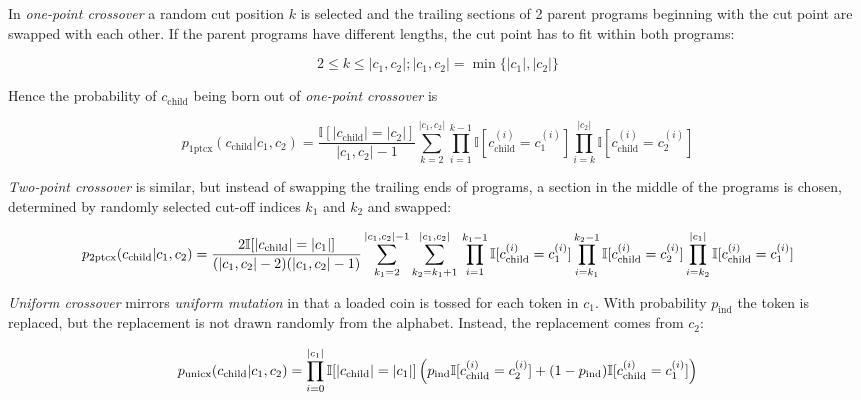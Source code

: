 In \emph{one-point crossover} a random cut position $k$ is selected and the trailing sections of 2 parent programs beginning with the cut point are swapped with each other. 
If the parent programs have different lengths, the cut point has to fit within both programs:

\begin{equation}
    2 \leq k \leq |c_1,c_2|; |c_1,c_2| = \min\{|c_1|, |c_2|\}
\end{equation}

Hence the probability of $c_\text{child}$ being born out of \emph{one-point crossover} is

\begin{equation}
    p_\text{1ptcx}(c_\text{child}|c_1,c_2) =
        \frac{\mathbb{I}[|c_\text{child}|=|c_2|]}{|c_1,c_2|-1}
        \sum\limits_{k=2}^{|c_1,c_2|} \prod\limits_{i=1}^{k-1} \mathbb{I}[c_\text{child}^{(i)} = c_1^{(i)}] \prod\limits_{i=k}^{|c_2|} \mathbb{I}[c_\text{child}^{(i)} = c_2^{(i)}]
\end{equation}

\emph{Two-point crossover} is similar, but instead of swapping the trailing ends of programs, a section in the middle of the programs is chosen, determined by randomly selected cut-off indices $k_1$ and $k_2$ and swapped:

\begin{equation}
    p_\text{2ptcx}(c_\text{child}|c_1,c_2) =
        \frac{2 \mathbb{I}[|c_\text{child}|=|c_1|]}{(|c_1,c_2|-2)(|c_1,c_2|-1)}
        \sum\limits_{k_1=2}^{|c_1,c_2|-1}
        \sum\limits_{k_2=k_1+1}^{|c_1,c_2|} \\
        \prod\limits_{i=1}^{k_1-1} \mathbb{I}[c_\text{child}^{(i)} = c_1^{(i)}] \prod\limits_{i=k_1}^{k_2-1} \mathbb{I}[c_\text{child}^{(i)} = c_2^{(i)}]
        \prod\limits_{i=k_2}^{|c_1|} \mathbb{I}[c_\text{child}^{(i)} = c_1^{(i)}]
\end{equation}

\emph{Uniform crossover} mirrors \emph{uniform mutation} in that a loaded coin is tossed for each token in $c_1$. With probability $p_\text{ind}$ the token is replaced, but the replacement is not drawn randomly from the alphabet. Instead, the replacement comes from $c_2$:

\begin{equation}
    p_\text{unicx}(c_\text{child}|c_1,c_2) = \prod\limits_{i=0}^{|c_1|} \mathbb{I}[|c_\text{child}|=|c_1|] \\ \left(p_\text{ind} \mathbb{I}[c_\text{child}^{(i)} = c_2^{(i)}] + (1 - p_\text{ind}) \mathbb{I}[c_\text{child}^{(i)} = c_1^{(i)}] \right)
\end{equation}

